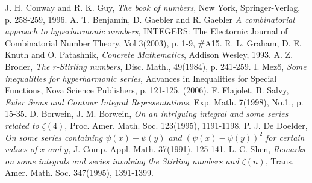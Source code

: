 \documentclass[a4paper,12pt]{amsart}
\begin{document}
\vspace{1cm}

\begin{thebibliography}{AAAAAA}
J. H. Conway and R. K. Guy, \emph{The book of numbers}, New York, Springer-Verlag, p. 258-259, 1996.
A. T. Benjamin, D. Gaebler and R. Gaebler \emph{A combinatorial approach to hyperharmonic numbers}, INTEGERS: The Electornic Journal of Combinatorial Number Theory, Vol 3(2003), p. 1-9, \#A15.
R. L. Graham, D. E. Knuth and O. Patashnik, \emph{Concrete Mathematics}, Addison Wesley, 1993.
A. Z. Broder, \emph{The $r$-Stirling numbers}, Disc. Math., 49(1984), p. 241-259.
I. Mez\H{o}, \emph{Some inequalities for hyperharmonic series}, Advances in Inequalities for Special Functions, Nova Science Publishers, p. 121-125. (2006).
F. Flajolet, B. Salvy, \emph{Euler Sums and Contour Integral Representations},
Exp. Math. 7(1998), No.1., p. 15-35.
D. Borwein, J. M. Borwein, \emph{On an intriguing integral and some series related to $\zeta(4)$}, Proc. Amer. Math. Soc. 123(1995), 1191-1198.
P. J. De Doelder, \emph{On some series containing $\psi(x)-\psi(y)$ and $(\psi(x)-\psi(y))^2$ for certain values of $x$ and $y$}, J. Comp. Appl. Math. 37(1991), 125-141.
L.-C. Shen, \emph{Remarks on some integrals and series involving the Stirling numbers and $\zeta(n)$}, Trans. Amer. Math. Soc. 347(1995), 1391-1399.

\end{thebibliography}
\end{document}
